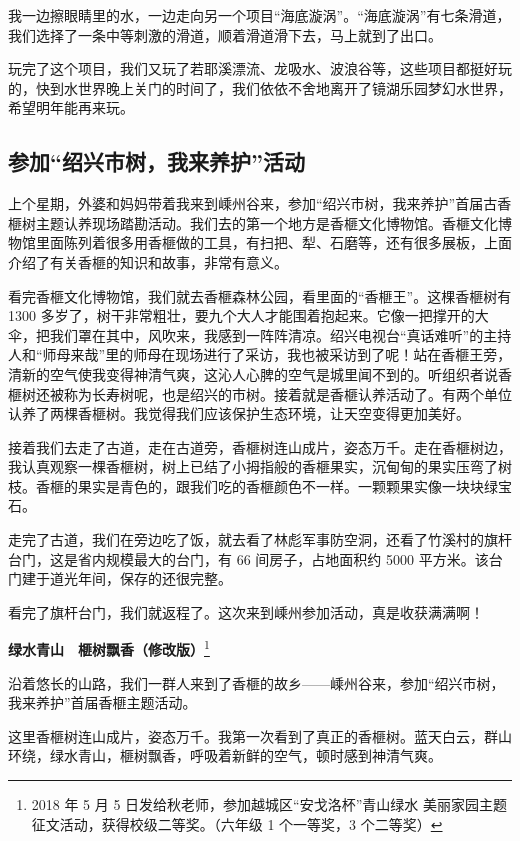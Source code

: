 \documentclass[UTF8,a4paper,titlepage,twoside,10.5pt]{article}
\begin{document}
我一边擦眼睛里的水，一边走向另一个项目“海底漩涡”。“海底漩涡”有七条滑道，我们选择了一条中等刺激的滑道，顺着滑道滑下去，马上就到了出口。

玩完了这个项目，我们又玩了若耶溪漂流、龙吸水、波浪谷等，这些项目都挺好玩的，快到水世界晚上关门的时间了，我们依依不舍地离开了镜湖乐园梦幻水世界，希望明年能再来玩。

\subsection{参加“绍兴市树，我来养护”活动}
\label{sec:orgb8ce3df}

上个星期，外婆和妈妈带着我来到嵊州谷来，参加“绍兴市树，我来养护”首届古香榧树主题认养现场踏勘活动。我们去的第一个地方是香榧文化博物馆。香榧文化博物馆里面陈列着很多用香榧做的工具，有扫把、犁、石磨等，还有很多展板，上面介绍了有关香榧的知识和故事，非常有意义。

看完香榧文化博物馆，我们就去香榧森林公园，看里面的“香榧王”。这棵香榧树有 1300 多岁了，树干非常粗壮，要九个大人才能围着抱起来。它像一把撑开的大伞，把我们罩在其中，风吹来，我感到一阵阵清凉。绍兴电视台“真话难听”的主持人和“师母来哉”里的师母在现场进行了采访，我也被采访到了呢！站在香榧王旁，清新的空气使我变得神清气爽，这沁人心脾的空气是城里闻不到的。听组织者说香榧树还被称为长寿树呢，也是绍兴的市树。接着就是香榧认养活动了。有两个单位认养了两棵香榧树。我觉得我们应该保护生态环境，让天空变得更加美好。

接着我们去走了古道，走在古道旁，香榧树连山成片，姿态万千。走在香榧树边，我认真观察一棵香榧树，树上已结了小拇指般的香榧果实，沉甸甸的果实压弯了树枝。香榧的果实是青色的，跟我们吃的香榧颜色不一样。一颗颗果实像一块块绿宝石。

走完了古道，我们在旁边吃了饭，就去看了林彪军事防空洞，还看了竹溪村的旗杆台门，这是省内规模最大的台门，有 66 间房子，占地面积约 5000 平方米。该台门建于道光年间，保存的还很完整。

看完了旗杆台门，我们就返程了。这次来到嵊州参加活动，真是收获满满啊！

\vspace*{\baselineskip}

\textbf{绿水青山　榧树飘香（修改版）}\footnote{2018 年 5 月 5 日发给秋老师，参加越城区“安戈洛杯”青山绿水 美丽家园主题征文活动，获得校级二等奖。（六年级 1 个一等奖，3 个二等奖）}

沿着悠长的山路，我们一群人来到了香榧的故乡——嵊州谷来，参加“绍兴市树，我来养护”首届香榧主题活动。

这里香榧树连山成片，姿态万千。我第一次看到了真正的香榧树。蓝天白云，群山环绕，绿水青山，榧树飘香，呼吸着新鲜的空气，顿时感到神清气爽。
\end{document}
